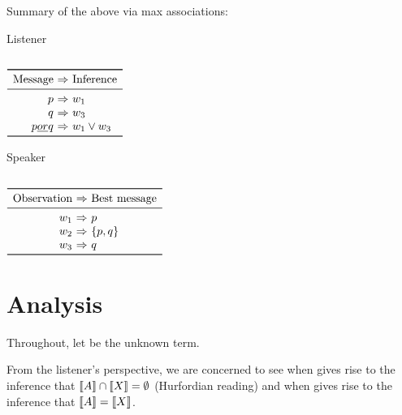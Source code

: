 \documentclass{article}
\begin{document}
\begin{examples}
\item Summary of the above via max associations:

  \begin{minipage}[t]{0.45\linewidth}
    Listener

    \vspace{2pt}
  
    $\begin{array}[t]{r @{ \ \Rightarrow \ } l}
      \toprule
      \text{Message} & \text{Inference} \\
      \midrule
      p &  w_{1}\\
      q & w_{3} \\
      p \word{ or } q & w_{1} \vee w_{3} \\
      \bottomrule
    \end{array}$
  \end{minipage}
  \hfill
  \begin{minipage}[t]{0.45\linewidth}
    Speaker

    \vspace{2pt}

    $\begin{array}[t]{r @{ \ \Rightarrow \ } l}
      \toprule
      \text{Observation} & \text{Best message} \\
      \midrule
      w_{1} & p \\
      w_{2} & \set{p, q} \\
      w_{3} & q  \\      
      \bottomrule
    \end{array}$
  \end{minipage}    
\end{examples}


\section{Analysis}\label{sec:analysis}

\begin{examples}
\item Throughout, let  be the unknown term.

\item From the listener's perspective, we are concerned to see when
   gives rise to the inference that $\llbracket A\rrbracket \cap \llbracket X\rrbracket
  = \emptyset$ (Hurfordian reading) and when  gives rise
  to the inference that $\llbracket A\rrbracket = \llbracket X\rrbracket$.
\end{examples}
\end{document}
